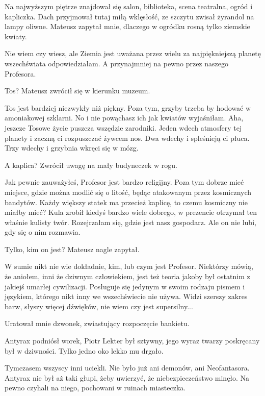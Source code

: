 Na najwyższym piętrze znajdował się salon, biblioteka, scena teatralna, ogród i kapliczka.
Dach przyjmował tutaj miłą wklęsłość, ze szczytu zwisał żyrandol na lampy oliwne.
Mateusz zapytał mnie, dlaczego w ogródku rosną tylko ziemskie kwiaty.

\ds{} Nie wiem czy wiesz, ale Ziemia jest uważana przez wielu za najpiękniejszą planetę wszechświata \dm{} odpowiedziałam. \dm{}
A przynajmniej na pewno przez naszego Profesora. \de{}

\ds{} Tos? \dm{} Mateusz zwrócił się w kierunku muzeum. \de{}

\ds{} Tos jest bardziej niezwykły niż piękny. Poza tym, grzyby trzeba by hodować w amoniakowej szklarni.
No i nie powąchasz ich jak kwiatów \ds{} wyjaśniłam. \dm{} Aha, jeszcze Tosowe życie puszcza wszędzie zarodniki. 
Jeden wdech atmosfery tej planety i zaczną ci rozpuszczać żywcem nos. Dwa wdechy i spleśnieją ci płuca. Trzy wdechy i grzybnia wkręci się w mózg. \de{}

\ds{} A kaplica? \dm{} Zwrócił uwagę na mały budyneczek w rogu. \de{}

\ds{} Jak pewnie zauważyłeś, Profesor jest bardzo religijny. Poza tym dobrze mieć miejsce, gdzie można modlić się o litość, będąc atakowanym przez kosmicznych bandytów. 
Każdy większy statek ma przecież kaplicę, to czemu kosmiczny nie miałby mieć? Kula zrobił kiedyś bardzo wiele dobrego, w prezencie otrzymał ten właśnie kulisty twór. \dm{}
Rozejrzałam się, gdzie jest nasz gospodarz. \dm{}
Ale on nie lubi, gdy się o nim rozmawia. \de{}

\ds{} Tylko, kim on jest? \dm{} Mateusz nagle zapytał. \de{}

\ds{} W sumie nikt nie wie dokładnie, kim, lub czym jest Profesor. Niektórzy mówią, że aniołem, inni że dziwnym człowiekiem,
jest też teoria jakoby był ostatnim z jakiejś umarłej cywilizacji. 
Posługuje się jedynym w swoim rodzaju pismem i językiem, którego nikt inny we wszechświecie nie używa.
Widzi szerszy zakres barw, słyszy więcej dźwięków, nie wiem czy jest supersilny... \de{}

Uratował mnie dzwonek, zwiastujący rozpoczęcie bankietu.

\divider{}

Antyrax podniósł worek, Piotr Lekter był sztywny, jego wyraz twarzy poskręcany był w dziwności. Tylko jedno oko lekko mu drgało.

Tymczasem wszyscy inni uciekli. Nie było już ani demonów, ani Neofantasora. Antyrax nie był aż taki głupi, żeby uwierzyć, że niebezpieczeństwo minęło. 
Na pewno czyhali na niego, pochowani w ruinach miasteczka.

